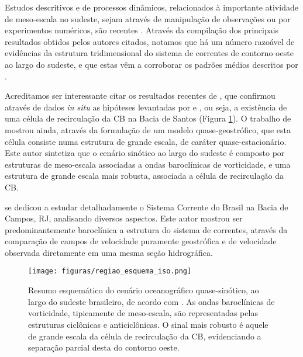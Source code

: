 Estudos descritivos e de processos dinâmicos, relacionados à importante
atividade de meso-escala no sudeste, sejam através de manipulação de observações ou por
experimentos numéricos, são recentes \citep{schmid_etal1995,lima1997,velhote1998,campos_etal2000,calado2001,fernandes2001,silveira_etal2004,godoi2005,
calado2006,mattos2006,silveira2006}. Através da compilação dos principais resultados obtidos pelos 
autores citados, notamos que há um número razoável de evidências da estrutura
tridimensional do sistema de correntes de contorno oeste ao largo do sudeste,
e que estas vêm a corroborar os padrões médios descritos por \cite{stramma_england1999}.

Acreditamos ser interessante citar os resultados recentes de \cite{mattos2006},
que confirmou através de dados {\it in situ} as hipóteses levantadas por \cite{tsuchiya1985} 
e \cite{vianna_menezes2005}, ou seja, a existência de uma célula de recirculação 
da CB na Bacia de Santos (Figura \ref{fig:subgiro}). O trabalho de \cite{mattos2006} mostrou ainda, através
da formulação de um modelo quase-geostrófico, que esta célula consiste numa estrutura de
grande escala, de caráter quase-estacionário. Este autor sintetiza que o cenário sinótico 
ao largo do sudeste é composto por estruturas de meso-escala associadas a ondas baroclínicas 
de vorticidade, e uma estrutura de grande escala mais robusta, associada a célula de recirculação da CB.

\cite{silveira2006} se dedicou a estudar detalhadamente o Sistema 
Corrente do Brasil na Bacia de Campos, RJ, analisando diversos aspectos.
Este autor mostrou ser predominantemente baroclínica a estrutura do sistema
de correntes, através da comparação de campos de velocidade puramente geostrófica
e de velocidade observada diretamente em uma mesma seção hidrográfica. 

\begin{figure}%
 \begin{center}
  \texttt{[image: figuras/regiao\_esquema\_iso.png]}
 \end{center}
 \vspace{-.5cm}
 \renewcommand{\baselinestretch}{1}
 \caption{\label{fig:subgiro} \small Resumo esquemático do cenário oceanográfico 
quase-sinótico, ao largo do sudeste brasileiro, de acordo com \cite{mattos2006}. 
As ondas baroclínicas de vorticidade, tipicamente de meso-escala, são representadas
 pelas estruturas ciclônicas e anticiclônicas. O sinal mais robusto é aquele de grande
escala da célula de recirculação da CB, evidenciando a separação parcial desta do contorno 
oeste.}
\end{figure}

